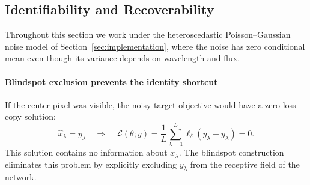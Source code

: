 \documentclass[twocolumn]{aastex7}
\newcommand{\algkey}[1]{\textcolor{BlindspotBlue}{\textbf{#1}}}
\newcounter{algorithm}
\renewcommand{\thealgorithm}{\arabic{algorithm}}
\newenvironment{algorithmblock}[1]{%
    \refstepcounter{algorithm}%
    \begin{tcolorbox}[
        colback=BlindspotBack,
        colframe=BlindspotBlue,
        coltitle=black,
        colbacktitle=BlindspotTitle,
        fonttitle=\bfseries,
        title={Algorithm~\thealgorithm. #1},
        boxrule=0.55pt,
        arc=2pt,
        left=0.8em,
        right=0.8em,
        top=0.45em,
        bottom=0.45em,
        before skip=0.8\baselineskip,
        after skip=0.8\baselineskip
    ]
    \small
}{%
    \end{tcolorbox}
}
\begin{document}

\subsection{Identifiability and Recoverability}
\label{sec:theory}

Throughout this section we work under the heteroscedastic Poisson--Gaussian noise model of Section~\ref{sec:implementation}, where the noise has zero conditional mean even though its variance depends on wavelength and flux.

\paragraph{Blindspot exclusion prevents the identity shortcut}
If the center pixel was visible, the noisy-target objective would have a zero-loss copy solution:
\[
\hat{x}_{\lambda}=y_{\lambda}
\quad\Longrightarrow\quad
\mathcal{L}(\theta;y)
= \frac{1}{L}\sum_{\lambda=1}^{L}
    \ell_{\delta}\!\left(y_{\lambda}-y_{\lambda}\right)
=0.
\]
This solution contains no information about $x_{\lambda}$. The blindspot construction eliminates this problem by explicitly excluding $y_{\lambda}$ from the receptive field of the network.
\end{document}
